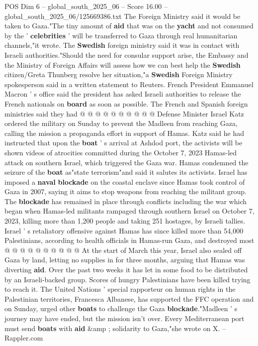 \begin{textsample}{POS Dim 6 – global\_south\_2025\_06 – Score 16.00 – global\_south\_2025\_06/125669386.txt}
The Foreign Ministry said it would be taken to Gaza."The tiny amount of \textbf{aid} that was on the \textbf{yacht} and not consumed by the ' \textbf{celebrities} ' will be transferred to Gaza through real humanitarian channels,"it wrote.
The \textbf{Swedish} foreign ministry said it was in contact with Israeli authorities."Should the need for consular support arise, the Embassy and the Ministry of Foreign Affairs will assess how we can best help the \textbf{Swedish} citizen/Greta Thunberg resolve her situation,"a \textbf{Swedish} Foreign Ministry spokesperson said in a written statement to Reuters.
French President Emmanuel Macron ' s office said the president has asked Israeli authorities to release the French nationals on \textbf{board} as soon as possible.
The French and Spanish foreign ministries said they had @ @ @ @ @ @ @ @ @ @ Defense Minister Israel Katz ordered the military on Sunday to prevent the Madleen from reaching Gaza, calling the mission a propaganda effort in support of Hamas.
Katz said he had instructed that upon the \textbf{boat} ' s arrival at Ashdod port, the activists will be shown videos of atrocities committed during the October 7, 2023 Hamas-led attack on southern Israel, which triggered the Gaza war.
Hamas condemned the seizure of the \textbf{boat} as"state terrorism"and said it salutes its activists.
Israel has imposed a \textbf{naval} \textbf{blockade} on the coastal enclave since Hamas took control of Gaza in 2007, saying it aims to stop weapons from reaching the militant group.
The \textbf{blockade} has remained in place through conflicts including the war which began when Hamas-led militants rampaged through southern Israel on October 7, 2023, killing more than 1,200 people and taking 251 hostages, by Israeli tallies.
Israel ' s retaliatory offensive against Hamas has since killed more than 54,000 Palestinians, according to health officials in Hamas-run Gaza, and destroyed most @ @ @ @ @ @ @ @ @ @ At the start of March this year, Israel also sealed off Gaza by land, letting no supplies in for three months, arguing that Hamas was diverting \textbf{aid}.
Over the past two weeks it has let in some food to be distributed by an Israeli-backed group.
Scores of hungry Palestinians have been killed trying to reach it.
The United Nations ' special rapporteur on human rights in the Palestinian territories, Francesca Albanese, has supported the FFC operation and on Sunday, urged other \textbf{boats} to challenge the Gaza \textbf{blockade}."Madleen ' s journey may have ended, but the mission isn't over.
Every Mediterranean port must send \textbf{boats} with \textbf{aid} \&amp ; solidarity to Gaza,"she wrote on X. -- Rappler.com

\end{textsample}
